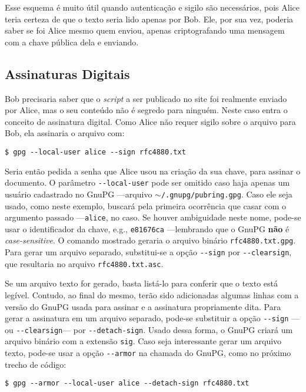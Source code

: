 \documentclass[12px,a4paper,twoside]{article}
\begin{document}
Esse esquema é muito útil quando autenticação e sigilo são necessários, pois
Alice teria certeza de que o texto seria lido apenas por Bob.  Ele, por sua
vez, poderia saber se foi Alice mesmo quem enviou, apenas criptografando uma
mensagem com a chave pública dela e enviando.

\subsection{Assinaturas Digitais}
\label{sec:pratica:assinaturas}
Bob precisaria saber que o \textit{script} a ser publicado no site foi
realmente enviado por Alice, mas o seu conteúdo não é segredo para ninguém.
Neste caso entra o conceito de assinatura digital.  Como Alice não requer
sigilo sobre o arquivo para Bob, ela assinaria o arquivo com:

\begin{verbatim}
$ gpg --local-user alice --sign rfc4880.txt
\end{verbatim}

Seria então pedida a senha que Alice usou na criação da sua chave, para assinar
o documento.  O parâmetro \texttt{-{}-local-user} pode ser omitido caso haja
apenas um usuário cadastrado no GnuPG ---arquivo
\texttt{$\sim$/.gnupg/pubring.gpg}.  Caso ele seja usado, como neste exemplo,
buscará pela primeira ocorrência que casar com o argumento passado
---\texttt{alice}, no caso.  Se houver ambiguidade neste nome, pode-se usar o
identificador da chave, e.g., \texttt{e81676ca} ---lembrando que o GnuPG
\textbf{não} é \textit{case-sensitive}.  O comando mostrado geraria o arquivo
binário \texttt{rfc4880.txt.gpg}. Para gerar um arquivo separado, substitui-se
a opção \texttt{-{}-sign} por \texttt{-{}-clearsign}, que resultaria no arquivo
\texttt{rfc4880.txt.asc}.

Se um arquivo texto for gerado, basta listá-lo para conferir que o texto está
legível.  Contudo, ao final do mesmo, terão sido adicionadas algumas linhas com
a versão do GnuPG usada para assinar e a assinatura propriamente dita.  Para
gerar a assinatura em um arquivo separado, pode-se substituir a opção
\texttt{-{}-sign} ---ou \texttt{-{}-clearsign}--- por \texttt{-{}-detach-sign}.
Usado dessa forma, o GnuPG criará um arquivo binário com a extensão
\texttt{sig}.  Caso seja interessante gerar um arquivo texto, pode-se usar a
opção \texttt{-{}-armor} na chamada do GnuPG, como no próximo trecho de código:

\begin{verbatim}
$ gpg --armor --local-user alice --detach-sign rfc4880.txt
\end{verbatim}
\end{document}
